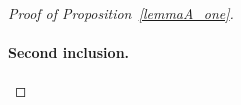 \documentclass[leqno,a4paper,12pt]{article}
\DeclareMathOperator{\lcm}{lcm}
\theoremstyle{definition}
\newcommand{\divides}{\mid}
\newcommand{\Z}{{\mathbb{Z}}}
\newcommand{\N}{{\mathbb{N}}}
\newcommand{\cC}{\mathcal{C}}
\newcommand{\sB}{\mathscr{B}}
\begin{document}
\begin{proof}[Proof of Proposition~\ref{lemmaA_one}]
\paragraph{Second inclusion.}
%
%

\end{proof}
\end{document}
